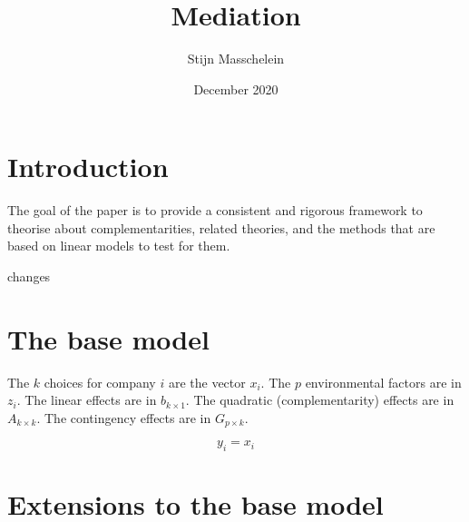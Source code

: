 \documentclass[]{article} %
\title{Mediation}
\author{Stijn Masschelein}
\date{December 2020}
\begin{document}
\maketitle

\section{Introduction}
The goal of the paper is to provide a consistent and rigorous framework to theorise about complementarities, related theories, and the methods that are based on linear models to test for them. 

changes

\section{The base model}

The $k$ choices for company $i$ are the vector $x_i$. The $p$ environmental factors are in $z_i$. The linear effects are in $b_{k \times 1}$. The quadratic (complementarity) effects are in $A_{k \times k}$. The contingency effects are in $G_{p \times k}$. 

\begin{equation}
\label{eq:management-function}
y_i = x_i 
\end{equation}

\section{Extensions to the base model}
\end{document}
